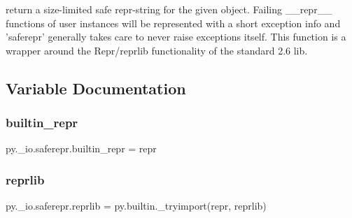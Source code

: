 \begin{DoxyVerb}return a size-limited safe repr-string for the given object.
Failing __repr__ functions of user instances will be represented
with a short exception info and 'saferepr' generally takes
care to never raise exceptions itself.  This function is a wrapper
around the Repr/reprlib functionality of the standard 2.6 lib.
\end{DoxyVerb}
 

\subsection{Variable Documentation}
\mbox{\label{namespacepy_1_1__io_1_1saferepr_a35b1d3868dd7cfcc70e8788fece2e56b}} 
\subsubsection{\texorpdfstring{builtin\+\_\+repr}{builtin\_repr}}
{\footnotesize\ttfamily py.\+\_\+io.\+saferepr.\+builtin\+\_\+repr = repr}

\mbox{\label{namespacepy_1_1__io_1_1saferepr_a056f331714e1b0a438d229e6fb9040ff}} 
\subsubsection{\texorpdfstring{reprlib}{reprlib}}
{\footnotesize\ttfamily py.\+\_\+io.\+saferepr.\+reprlib = py.\+builtin.\+\_\+tryimport(\textquotesingle{}repr\textquotesingle{}, \textquotesingle{}reprlib\textquotesingle{})}

